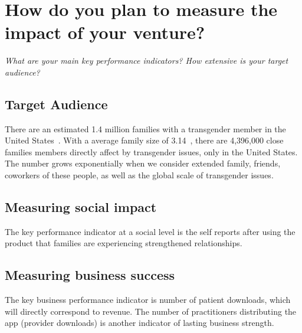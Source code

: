 \section{How do you plan to measure the impact of your venture?}

\textit{What are your main key performance indicators?
How extensive is your target audience?
}

\subsection{Target Audience}
There are an estimated 1.4 million families with a transgender member in the United States~\cite{howmanytrans}. With a average family size of 3.14~\cite{}, there are 4,396,000 close families members directly affect by transgender issues, only in the United States. The number grows exponentially when we consider extended family, friends, coworkers of these people, as well as the global scale of transgender issues. 

\subsection{Measuring social impact} 
The key performance indicator at a social level is the self reports after using the product that families are experiencing strengthened relationships.

\subsection{Measuring business success}
The key business performance indicator is number of patient downloads, which will directly correspond to revenue.
The number of practitioners distributing the app (provider downloads) is another indicator of lasting business strength.